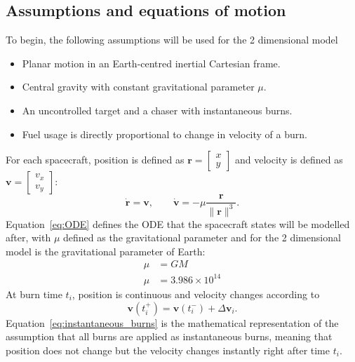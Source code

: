 \documentclass[11pt,letterpaper]{article}
\begin{document}
\subsection{Assumptions and equations of motion}
To begin, the following assumptions will be used for the 2 dimensional model
\begin{itemize}
  \item Planar motion in an Earth-centred inertial Cartesian frame.
  \item Central gravity with constant gravitational parameter $\mu$.
  \item An uncontrolled target and a chaser with instantaneous burns.
  \item Fuel usage is directly proportional to change in velocity of a burn.
\end{itemize}
For each spacecraft, position is defined as $\mathbf r=\begin{bmatrix} x \\ y \end{bmatrix}$ and velocity is defined as $\mathbf v=\begin{bmatrix} v_x \\ v_y \end{bmatrix}$:
\begin{equation}
  \dot{\mathbf r}=\mathbf v,
  \qquad \dot{\mathbf v}=-\mu\frac{\mathbf r}{\|\mathbf r\|^3}.
  \label{eq:ODE}
\end{equation}
Equation~\eqref{eq:ODE} defines the ODE that the spacecraft states will be modelled after, with $\mu$ defined as the gravitational parameter and for the 2 dimensional model
is the gravitational parameter of Earth:
\begin{align*}
  \mu&=GM\\
  \mu&=3.986\times10^{14}
\end{align*}
At burn time $t_i$, position is continuous and velocity changes according to
\begin{equation}
  \mathbf v(t_i^+)=\mathbf v(t_i^-)+\Delta\mathbf v_i.
  \label{eq:instantaneous_burns}
\end{equation}
Equation~\eqref{eq:instantaneous_burns} is the mathematical representation of the assumption that all burns are applied as instantaneous burns, meaning that position does
not change but the velocity changes instantly right after time $t_i$. 
\end{document}
